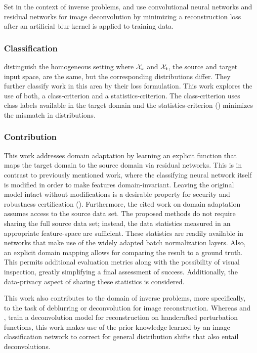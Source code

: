 Set in the context of inverse problems, 
\cite{IP_Deconv} and \cite{IP_VN} use convolutional neural networks 
and residual networks for image deconvolution by minimizing a reconstruction loss
after an artificial blur kernel is applied to training data.



\subsubsection{Classification}

\cite{DA_SURVEY} distinguish the homogeneous setting 
where $\mathcal X_s$ and $\mathcal X_t$, the source and target input space, are the same,
but the corresponding distributions differ.
They further classify work in this area by their loss formulation.
This work explores the use of both, a class-criterion
and a statistics-criterion.
The class-criterion
uses class labels available in the target domain
and the statistics-criterion (\cite{DA_SURVEY}) 
minimizes the mismatch in distributions.

\subsubsection{Contribution}

This work addresses domain adaptation by learning an explicit function 
that maps the 
target domain to the source domain via residual networks.
This is in contrast to previously mentioned work, 
where the classifying neural network itself is modified 
in order to make features domain-invariant.
Leaving the original model intact without modifications is a desirable property 
for security and robustness certification (\cite{NEURIPS2019_f7fa6aca}).
Furthermore, the cited work on domain adaptation assumes access to the source data set.
The proposed methods do not require sharing the full source data set;
instead, the data statistics measured in an appropriate feature-space are sufficient.
These statistics are readily available in networks that make use of
the widely adapted batch normalization layers.
Also, an explicit domain mapping allows for
comparing the result to a ground truth.
This permits additional evaluation metrics along with the possibility of visual inspection,
greatly simplifying a final assessment of success.
Additionally, the data-privacy aspect of sharing these statistics
is considered.

This work also contributes to the domain of inverse problems,
more specifically, to the task of deblurring or deconvolution 
for image reconstruction.
Whereas \cite{IP_Deconv} and \cite{IP_VN}, 
train a deconvolution model for
reconstruction on handcrafted perturbation functions, 
this work makes use of the prior knowledge
learned by an image classification network 
to correct for general distribution shifts
that also entail deconvolutions.

